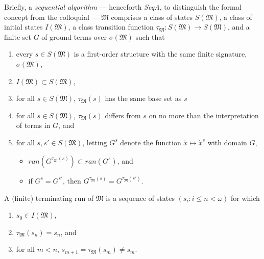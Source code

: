 \documentclass[12pt]{article}
\numberwithin{equation}{section}
\begin{document}
Briefly, a \emph{sequential algorithm} --- henceforth \textit{SeqA}, to distinguish the formal concept from the colloquial --- $\mathfrak{M}$ comprises a class of states $S(\mathfrak{M})$, a class of initial states $I(\mathfrak{M})$, a class transition function $\tau_{\mathfrak{M}} : S(\mathfrak{M}) \longrightarrow S(\mathfrak{M})$, and a finite set $G$ of ground terms over $\sigma(\mathfrak{M})$ such that
\begin{enumerate}[label=(A\arabic*)]
    \item\label{a1} every $s \in S(\mathfrak{M})$ is a first-order structure with the same finite signature, $\sigma(\mathfrak{M})$,
    \item\label{a2} $I(\mathfrak{M}) \subset S(\mathfrak{M})$,
    \item\label{a3'} for all $s \in S(\mathfrak{M})$, $\tau_{\mathfrak{M}}(s)$ has the same base set as $s$
    \item\label{a3} for all $s \in S(\mathfrak{M})$, $\tau_{\mathfrak{M}}(s)$ differs from $s$ on no more than the interpretation of terms in $G$, and
    \item\label{a4} for all $s, s' \in S(\mathfrak{M})$, letting $G^s$ denote the function $\dot{x} \mapsto \dot{x}^s$ with domain $G$,
    \begin{itemize}
        \item $ran(G^{\tau_{\mathfrak{M}}(s)}) \subset ran(G^s)$, and
        \item if $G^s = G^{s'}$, then $G^{\tau_{\mathfrak{M}}(s)} = G^{\tau_{\mathfrak{M}}(s')}$.
    \end{itemize}
\end{enumerate}
A (finite) terminating run of $\mathfrak{M}$ is a sequence of states $(s_i : i \leq n < \omega)$ for which
\begin{enumerate}[label=(B\arabic*)]
    \item $s_0 \in I(\mathfrak{M})$,
    \item $\tau_{\mathfrak{M}}(s_n) = s_n$, and
    \item for all $m < n$, $s_{m+1} = \tau_{\mathfrak{M}}(s_m) \neq s_m$.
\end{enumerate}
\end{document}

